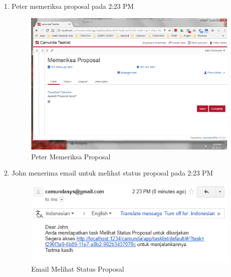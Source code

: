 \begin{enumerate}
		\item Peter memeriksa proposal pada 2:23 PM
		\begin{figure}[H]
			\centering
			\includegraphics[scale=0.5]{Gambar/Bab-5/kasus1/6}
			\caption{Peter Memeriksa Proposal} 
			\label{fig:pengujian_kasus1_6}
	\end{figure}
	
		\item John menerima email untuk melihat status proposal pada 2:23 PM
		\begin{figure}[H]
			\centering
			\includegraphics[scale=0.8]{Gambar/Bab-5/kasus1/7}
			\caption{Email Melihat Status Proposal} 
			\label{fig:pengujian_kasus1_7}
	\end{figure}
	

\end{enumerate}
